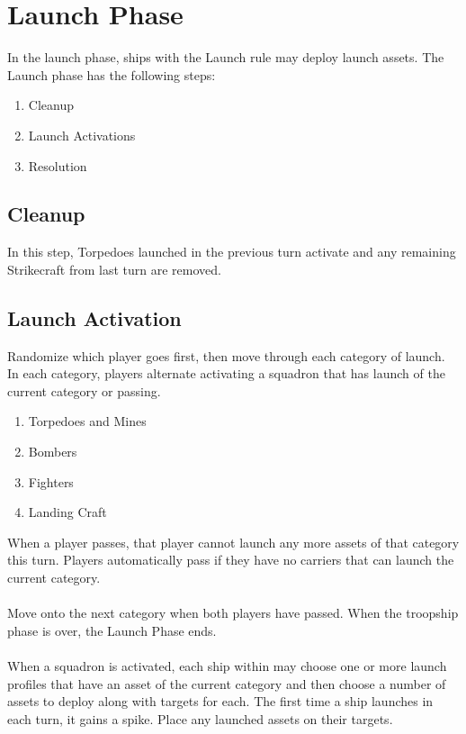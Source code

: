 \chapter{Launch Phase}

In the launch phase, ships with the Launch rule may deploy launch assets. The Launch phase has the following steps:
\begin{enumerate}
	\item Cleanup
	\item Launch Activations
	\item Resolution
\end{enumerate}

\section{Cleanup}
In this step, Torpedoes launched in the previous turn activate and any remaining Strikecraft from last turn are removed.

\section{Launch Activation}

Randomize which player goes first, then move through each category of launch. In each category, players alternate activating a squadron that has launch of the current category or passing.
 \begin{enumerate}
 	\item Torpedoes and Mines
 	\item Bombers
 	\item Fighters
 	\item Landing Craft
 \end{enumerate}
 When a player passes, that player cannot launch any more assets of that category this turn. Players automatically pass if they have no carriers that can launch the current category.
 \\\\
 Move onto the next category when both players have passed. When the troopship phase is over, the Launch Phase ends.
 \\\\
 When a squadron is activated, each ship within may choose one or more launch profiles that have an asset of the current category and then choose a number of assets to deploy along with targets for each. The first time a ship launches in each turn, it gains a spike. Place any launched assets on their targets.
 
